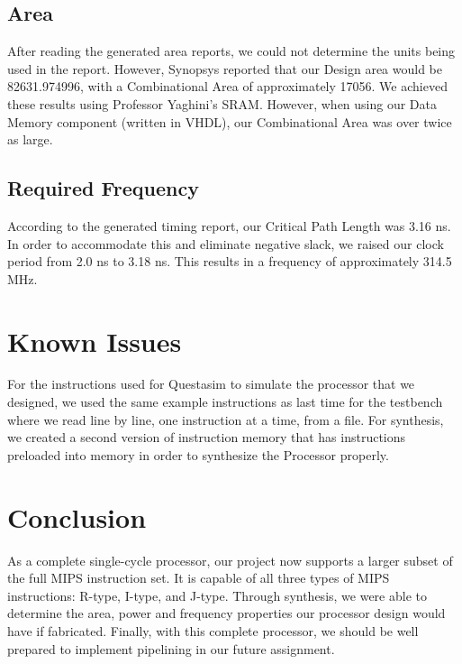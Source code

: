 \documentclass{article}
\begin{document}
\subsection{Area}
After reading the generated area reports, we could not determine the units being used in the report. However, Synopsys reported that our Design area would be 82631.974996, with a Combinational Area of approximately 17056. We achieved these results using Professor Yaghini's SRAM. However, when using our Data Memory component (written in VHDL), our Combinational Area was over twice as large.

\subsection{Required Frequency}
According to the generated timing report, our Critical Path Length was 3.16 ns. In order to accommodate this and eliminate negative slack, we raised our clock period from 2.0 ns to 3.18 ns. This results in a frequency of approximately 314.5 MHz.

\section{Known Issues} 
For the instructions used for Questasim to simulate the processor that we designed, we used the same example instructions as last time for the testbench where we read line by line, one instruction at a time, from a file.  For synthesis, we created a second version of instruction memory that has instructions preloaded into memory in order to synthesize the Processor properly.
\\
\section{Conclusion}

As a complete single-cycle processor, our project now supports a larger subset of the full MIPS instruction set. It is capable of all three types of MIPS instructions: R-type, I-type, and J-type. Through synthesis, we were able to determine the area, power and frequency properties our processor design would have if fabricated. Finally, with this complete processor, we should be well prepared to implement pipelining in our future assignment.
\end{document}
